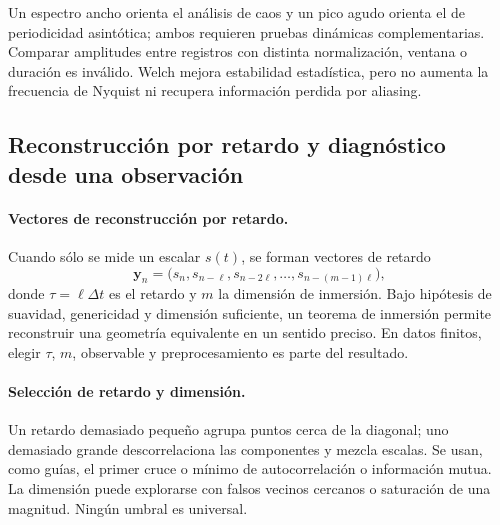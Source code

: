 \begin{warningbox}
Un espectro ancho orienta el análisis de caos y un pico agudo orienta el de periodicidad
asintótica; ambos requieren pruebas dinámicas complementarias. Comparar amplitudes entre registros con distinta normalización, ventana o
duración es inválido. Welch mejora estabilidad estadística, pero no aumenta la
frecuencia de Nyquist ni recupera información perdida por aliasing.
\end{warningbox}


\subsection{Reconstrucción por retardo y diagnóstico desde una observación}

\paragraph{Vectores de reconstrucción por retardo.}
Cuando sólo se mide un escalar \(s(t)\), se forman vectores de retardo
\[
 \mathbf y_n=
 \bigl(s_n,s_{n-\ell},s_{n-2\ell},\ldots,s_{n-(m-1)\ell}\bigr),
\]
donde \(\tau=\ell\Delta t\) es el retardo y \(m\) la dimensión de inmersión. Bajo
hipótesis de suavidad, genericidad y dimensión suficiente, un teorema de inmersión
permite reconstruir una geometría equivalente en un sentido preciso. En datos
finitos, elegir \(\tau\), \(m\), observable y preprocesamiento es parte del resultado.

\paragraph{Selección de retardo y dimensión.}
Un retardo demasiado pequeño agrupa puntos cerca de la diagonal; uno demasiado grande
descorrelaciona las componentes y mezcla escalas. Se usan, como guías, el primer cruce
o mínimo de autocorrelación o información mutua. La dimensión puede explorarse con
falsos vecinos cercanos o saturación de una magnitud. Ningún umbral es universal.

